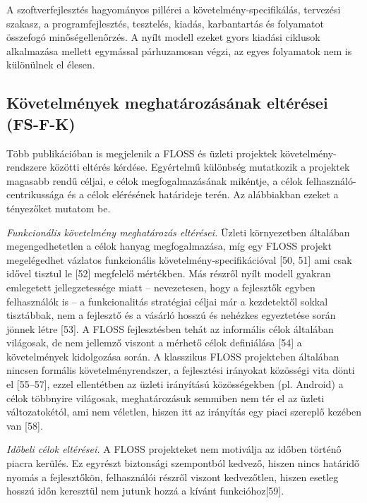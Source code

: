 \documentclass[12pt,magyar,a4paper,oneside]{scrreprt}
\begin{document}
A szoftverfejlesztés hagyományos pillérei a követelmény-specifikálás,
tervezési szakasz, a programfejlesztés, tesztelés, kiadás, karbantartás
és folyamatot összefogó minőségellenőrzés. A nyílt modell ezeket gyors
kiadási ciklusok alkalmazása mellett egymással párhuzamosan végzi, az
egyes folyamatok nem is különülnek el élesen.

\hypertarget{sec:FS-F-K}{%
\subsection{Követelmények meghatározásának eltérései
(FS-F-K)}\label{sec:FS-F-K}}

Több publikációban is megjelenik a FLOSS és üzleti projektek
követelmény-rendszere közötti eltérés kérdése. Egyértelmű különbség
mutatkozik a projektek magasabb rendű céljai, e célok megfogalmazásának
mikéntje, a célok felhasználó-centrikussága és a célok elérésének
határideje terén. Az alábbiakban ezeket a tényezőket mutatom be.

\emph{Funkcionális követelmény meghatározás eltérései.} Üzleti
környezetben általában megengedhetetlen a célok hanyag megfogalmazása,
míg egy FLOSS projekt megelégedhet vázlatos funkcionális
követelmény-specifikációval {[}50, 51{]} ami csak idővel tisztul le
{[}52{]} megfelelő mértékben. Más részről nyílt modell gyakran
emlegetett jellegzetessége miatt -- nevezetesen, hogy a fejlesztők
egyben felhasználók is -- a funkcionalitás stratégiai céljai már a
kezdetektől sokkal tisztábbak, nem a fejlesztő és a vásárló hosszú és
nehézkes egyeztetése során jönnek létre {[}53{]}. A FLOSS fejlesztésben
tehát az informális célok általában világosak, de nem jellemző viszont a
mérhető célok definiálása {[}54{]} a követelmények kidolgozása során. A
klasszikus FLOSS projekteben általában nincsen formális
követelményrendszer, a fejlesztési irányokat közösségi vita dönti el
{[}55--57{]}, ezzel ellentétben az üzleti irányítású közösségekben (pl.
Android) a célok többnyire világosak, meghatározásuk semmiben nem tér el
az üzleti változatokétól, ami nem véletlen, hiszen itt az irányítás egy
piaci szereplő kezében van {[}58{]}.

\emph{Időbeli célok eltérései.} A FLOSS projekteket nem motiválja az
időben történő piacra kerülés. Ez egyrészt biztonsági szempontból
kedvező, hiszen nincs határidő nyomás a fejlesztőkön, felhasználói
részről viszont kedvezőtlen, hiszen esetleg hosszú időn keresztül nem
jutunk hozzá a kívánt funkcióhoz{[}59{]}.
\end{document}
